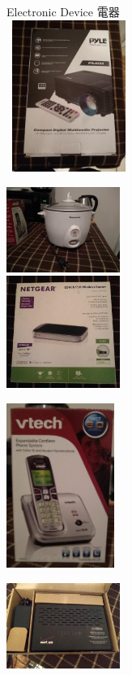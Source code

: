 \documentclass{article}[12pt]
\begin{document}
{\begin{minipage}[t][\textheight-27pt][t]{445pt}
%
Electronic Device 電器\dotfill \\[5pt]
\mbox{ }\hspace{2pt}\includegraphics[width=105pt]{projector_mini.jpg}
\begin{minipage}[b]{110pt}
\includegraphics[width=105pt]{rice_cooker_mini.jpg} \\
\includegraphics[width=105pt]{netgear_wireless_router_mini.jpg} 
\end{minipage} \hspace{-2pt}
\includegraphics[width=100pt]{home_phone_mini.jpg}
\begin{minipage}[b]{110pt}
\includegraphics[width=105pt]{verizon_modem01_mini.jpg} \\

\end{minipage}
\end{minipage}}
\end{document}
